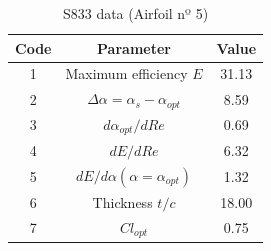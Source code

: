 \documentclass[../TFG_Annex.tex]{subfiles}
\begin{document}
\begin{table}[h!]
	\centering
	\begin{tabular}{c|c|c}
		Code & Parameter                                    & Value  \\ \hline
		1    & Maximum efficiency $E$                      &       31.13           \\
		2    & $\Delta \alpha=\alpha_{s}-\alpha_{opt}$    &           8.59          \\
		3    & ${d\alpha_{opt}}/{dRe}$                     &             0.69     \\
		4    & ${dE}/{dRe}$                                &        6.32           \\
		5    & ${dE}/{d \alpha} (\alpha=\alpha_{opt})$      &           1.32        \\
		6    & Thickness $t/c$                            &              18.00      \\
		7    & $Cl_{opt}$  &   0.75
	\end{tabular}
	\caption{S833 data (Airfoil nº 5)}
	\label{tab:Airf5}
\end{table}
\end{document}
